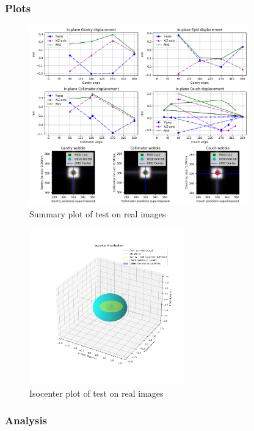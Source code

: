 \subsubsection{Plots}

\begin{figure}[H]
    \centering
    \includegraphics[width=0.85\textwidth]{Content/Images/analysis_wl_oncology_summary_plot.png}
    \caption{Summary plot of test on real images}
\end{figure}

\begin{figure}[H]
    \centering
    \includegraphics[width=0.60\textwidth]{Content/Images/analysis_wl_oncology_isocenter_plot.png}
    \caption{Isocenter plot of test on real images}
\end{figure}

\subsubsection{Analysis}

